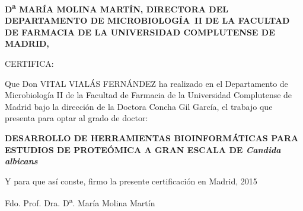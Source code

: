 %
%
%
%
%
%




\thispagestyle{empty}



\noindent
\textbf{
D\textsuperscript{a} MAR\'IA MOLINA MART\'IN, DIRECTORA DEL DEPARTAMENTO DE
\mbox{MICROBIOLOG\'IA II}
DE LA FACULTAD DE FARMACIA DE LA UNIVERSIDAD COMPLUTENSE DE MADRID,
}

\vspace{1cm}

\noindent
CERTIFICA:

\vspace{1cm}

\noindent
Que Don VITAL VIAL\'AS FERN\'ANDEZ ha realizado en el Departamento de
 Microbiolog\'ia II de 
la Facultad de Farmacia de la Universidad Complutense de Madrid bajo la direcci\'on de la
Doctora Concha Gil Garc\'ia, el trabajo que presenta para optar al grado de doctor:

\vspace{2cm}

\begin{center}
\textbf{
DESARROLLO DE HERRAMIENTAS BIOINFORM\'ATICAS PARA ESTUDIOS DE PROTE\'OMICA A GRAN
ESCALA DE \textit{Candida albicans}
}
\end{center}

\vspace{2cm}

Y para que as\'i conste, firmo la presente certificaci\'on en Madrid, 2015

\vspace{5cm}

\centerline{Fdo. Prof. Dra. D\textsuperscript{a}. Mar\'ia Molina Mart\'in}


\newpage
\thispagestyle{empty}\mbox{}
\newpage
 


